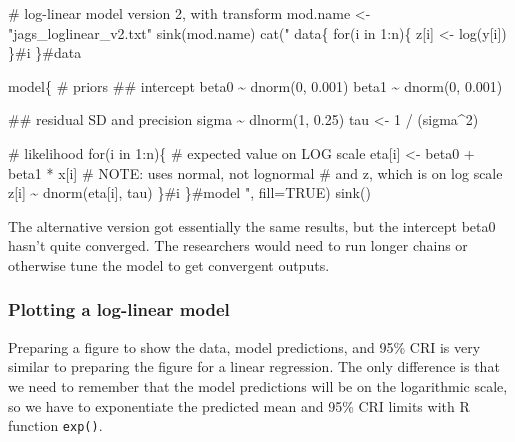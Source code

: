 \documentclass[
  13,
  letterpaper,
]{report}
\newenvironment{Shaded}{\begin{snugshade}}{\end{snugshade}}
\newcommand{\AttributeTok}[1]{\textcolor[rgb]{0.40,0.45,0.13}{#1}}
\newcommand{\CommentTok}[1]{\textcolor[rgb]{0.37,0.37,0.37}{#1}}
\newcommand{\ConstantTok}[1]{\textcolor[rgb]{0.56,0.35,0.01}{#1}}
\newcommand{\FunctionTok}[1]{\textcolor[rgb]{0.28,0.35,0.67}{#1}}
\newcommand{\NormalTok}[1]{\textcolor[rgb]{0.00,0.23,0.31}{#1}}
\newcommand{\OtherTok}[1]{\textcolor[rgb]{0.00,0.23,0.31}{#1}}
\newcommand{\StringTok}[1]{\textcolor[rgb]{0.13,0.47,0.30}{#1}}
\begin{document}
\begin{Shaded}
\begin{Highlighting}[]
\CommentTok{\# log{-}linear model version 2, with transform}
\NormalTok{mod.name }\OtherTok{\textless{}{-}} \StringTok{"jags\_loglinear\_v2.txt"}
\FunctionTok{sink}\NormalTok{(mod.name)}
\FunctionTok{cat}\NormalTok{(}\StringTok{"}
\StringTok{    data\{}
\StringTok{        for(i in 1:n)\{}
\StringTok{            z[i] \textless{}{-} log(y[i])}
\StringTok{        \}\#i}
\StringTok{    \}\#data}

\StringTok{    model\{}
\StringTok{        \# priors}
\StringTok{        \#\# intercept}
\StringTok{        beta0 \textasciitilde{} dnorm(0, 0.001)}
\StringTok{        beta1 \textasciitilde{} dnorm(0, 0.001)}

\StringTok{        \#\# residual SD and precision}
\StringTok{        sigma \textasciitilde{} dlnorm(1, 0.25)}
\StringTok{        tau \textless{}{-} 1 / (sigma\^{}2)}

\StringTok{        \# likelihood}
\StringTok{        for(i in 1:n)\{}
\StringTok{            \# expected value on LOG scale}
\StringTok{            eta[i] \textless{}{-} beta0 + beta1 * x[i]}
\StringTok{            \# NOTE: uses normal, not lognormal}
\StringTok{            \# and z, which is on log scale}
\StringTok{            z[i] \textasciitilde{} dnorm(eta[i], tau)}
\StringTok{        \}\#i}
\StringTok{    \}\#model}
\StringTok{"}\NormalTok{, }\AttributeTok{fill=}\ConstantTok{TRUE}\NormalTok{)}
\FunctionTok{sink}\NormalTok{()}
\end{Highlighting}
\end{Shaded}

The alternative version got essentially the same results, but the
intercept beta0 hasn't quite converged. The researchers would need to
run longer chains or otherwise tune the model to get convergent outputs.

\subsubsection{Plotting a log-linear
model}\label{plotting-a-log-linear-model}

Preparing a figure to show the data, model predictions, and 95\% CRI is
very similar to preparing the figure for a linear regression. The only
difference is that we need to remember that the model predictions will
be on the logarithmic scale, so we have to exponentiate the predicted
mean and 95\% CRI limits with R function \texttt{exp()}.
\end{document}
